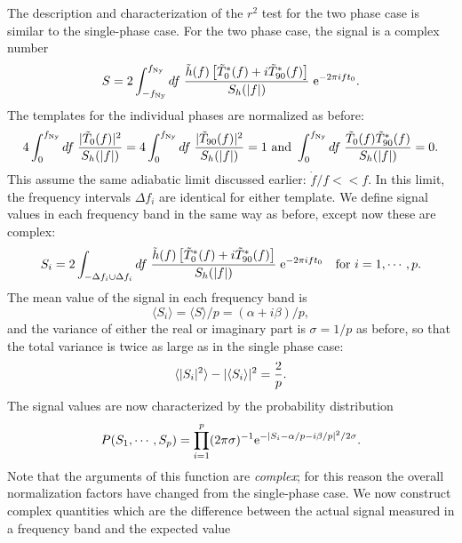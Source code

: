 The description and characterization of the $r^2$ test for the two phase
case is similar to the single-phase case.  For the two phase case, the signal
is a complex number
\begin{equation}
\label{e:twophasesig}
S = 2 \int_{-f_{\rm Ny}}^{f_{\rm Ny}} df \; { \tilde h(f)
\left[ \tilde T_0^* (f) +i \tilde T_{90}^* (f) \right]
\over S_h(|f|)}
 \; {\rm e}^{- 2 \pi i f t_0}.
\end{equation}
The templates for the individual phases are normalized as before:
\begin{equation}
4 \int_0^{f_{\rm Ny}}  df \; { | \tilde T_0   (f)|^2 \over
S_h(|f|) } = 
4 \int_0^{f_{\rm Ny}}  df \; { | \tilde T_{90}(f)|^2 \over
S_h(|f|)} =1 
{\rm \ and\ } 
  \int_0^{f_{\rm Ny}}  df \; {  \tilde T_0(f)  \tilde T^*_{90}(f)  \over
S_h(|f|)} = 0.
\end{equation}
This assume the same adiabatic limit discussed earlier: ${\dot f}/f << f$.
In this limit, the frequency intervals $\Delta f_i$ are identical for either template.
We define signal values in each frequency band in the same way as before, except now
these are complex:
\begin{equation}
S_i = 2 \int_{-\Delta f_i \cup \Delta f_i} df \; { \tilde h(f)
\left[ \tilde T_0^* (f) +i \tilde T_{90}^* (f) \right]
\over S_h(|f|)}
 \; {\rm e}^{- 2 \pi i f t_0} \quad {\rm for\ } i=1,\cdots,p.
\end{equation}
The mean value of the signal in each frequency band is
\begin{equation}
\langle S_i \rangle = \langle S \rangle /p = (\alpha + i \beta)/p,
\end{equation}
and the variance of either the real or imaginary part is $\sigma=1/p$
as before, so that the total variance is twice as large as in the single
phase case:
\begin{equation}
\langle | S_i | ^2 \rangle - | \langle S_i \rangle |^2 = {2 \over p}.
\end{equation}
The signal values are now characterized by the probability distribution
\begin{equation}
P(S_1,\cdots,S_p) = \prod_{i=1}^p (2 \pi \sigma)^{-1} 
{\rm e}^{- { \left|S_i - \alpha /p - i \beta/p \right|^2 / 2 \sigma}}.
\end{equation}
Note that the arguments of this function are {\it complex}; for this reason the
overall normalization factors have changed from the single-phase case.
We now construct complex quantities which are the difference between
the actual signal measured in a frequency band and the expected value
